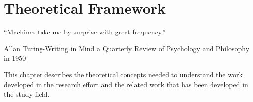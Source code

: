 \chapter{Theoretical Framework}
\label{chapter:theoretical-framework}

\epigraph{``Machines take me by surprise with great frequency.''}{\vspace{10pt}Allan Turing-Writing in Mind a Quarterly Review of Psychology and Philosophy in 1950}

\newpage

This chapter describes the theoretical concepts needed to understand the work developed in the research effort and the related work that has been developed in the study field.


%
%
%
%
%


%
%
%
%
%


